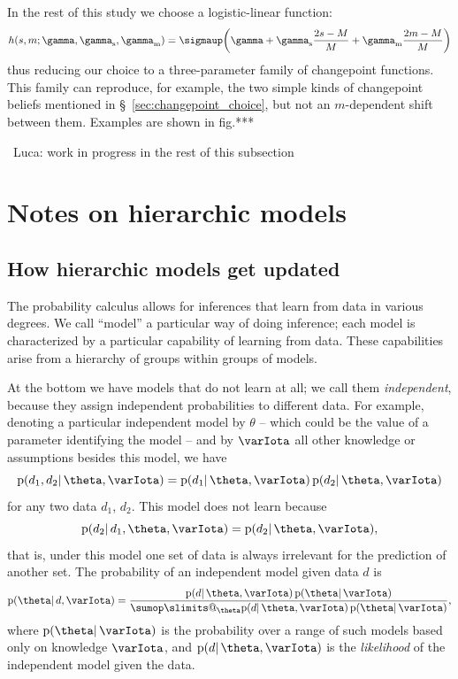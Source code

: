 \documentclass[\ifafour a4paper,12pt,\else a5paper,10pt,\fi%
onecolumn,oneside,article,%
british%
]{memoir}
\makeatletter
\theoremstyle{remark}
\theoremstyle{innote}
\def\sum{\DOTSI\sumop\slimits@}
\newcommand*{\pf}{\mathrm{p}}%
\renewcommand*{\|}{\mathpunct{|}}
\newcommand*{\sect}{\S}%
\newcommand*{\fig}{fig.}%
\newcommand*{\puzzle}{\maltese}
\newcommand{\mynote}[1]{ {\color{notecolour}\puzzle\ #1\ }}
\newcommand*{\yI}{\varIota}
\newcommand*{\yth}{\theta}
\newcommand*{\yrs}{h}
\newcommand*{\yc}{\gamma}
\newcommand*{\ycs}{\gamma_{\textrm{s}}}
\newcommand*{\ycm}{\gamma_{\textrm{m}}}
\newcommand*{\logistic}{\sigmaup}
\makeatother
\begin{document}
In the rest of this study we choose a logistic-linear function:
\begin{equation}
  \label{eq:logistic_linear}
  \yrs(s,m; \yc,\ycs,\ycm) = \logistic\biggl( \yc +
  \ycs \frac{2s-M}{M} + \ycm \frac{2m-M}{M}\biggr) 
\end{equation}
thus reducing our choice to a three-parameter family of changepoint
functions. This family can reproduce, for example, the two simple kinds of
changepoint beliefs mentioned in \sect~\ref{sec:changepoint_choice}, but
not an $m$-dependent shift between them. Examples are shown in \fig***




\bigskip\mynote{Luca: work in progress in the rest of this subsection}


\clearpage

\section{Notes on hierarchic models}
\label{sec:notes_hierarchic}

\subsection{How hierarchic models get updated}
\label{sec:hierarchic_models}

The probability calculus allows for inferences that learn from data in
various degrees. We call \enquote{model} a particular way of doing
inference; each model is characterized by a particular capability of
learning from data. These capabilities arise from a hierarchy of groups
within groups of models.

At the bottom we have models that do not learn at all; we call them
\emph{independent}, because they assign independent probabilities to
different data. For example, denoting a particular independent model by
$\yth$ -- which could be the value of a parameter identifying the model --
and by $\yI$ all other knowledge or assumptions besides this model, we have
\begin{equation}
  \label{eq:indep_model}
  \pf(d_1,d_2 \| \yth, \yI) = \pf(d_1 \|\yth,\yI) \, \pf(d_2 \|\yth,\yI)
\end{equation}
for any two data $d_1$, $d_2$. This model does not learn because
\begin{equation}
  \label{eq:indep_model_nolearn}
  \pf(d_2\| d_1, \yth, \yI) = \pf(d_2 \|\yth,\yI),
\end{equation}
that is, under this model one set of data is always irrelevant for the
prediction of another set. The probability of an independent model given
data $d$ is
\begin{equation}
  \label{eq:prob_indep_model}
  \pf(\yth \| d, \yI)
  = \frac{
    \pf(d \|\yth,\yI) \, \pf(\yth \| \yI)
  }{
    \sum_{\yth}\pf(d \|\yth,\yI) \, \pf(\yth \| \yI)
  },
\end{equation}
where $\pf(\yth \|\yI)$ is the probability over a range of such models
based only on knowledge $\yI$, and $\pf(d \|\yth,\yI)$ is the
\emph{likelihood} of the independent model given the data.
\end{document}
